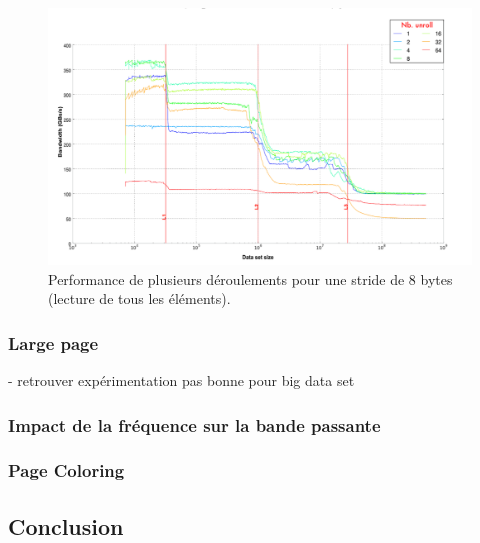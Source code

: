      
    \begin{figure}
    \center
    \includegraphics[width=16cm]{images/dml_unroll_best.png}
    \caption{\label{pic:dml_unroll_best} Performance de plusieurs déroulements pour une stride de 8 bytes (lecture de tous les éléments).}
    \end{figure}
    
    
    \subsubsection{Large page}
    - retrouver expérimentation pas bonne pour big data set
    
    
    \subsubsection{Impact de la fréquence sur la bande passante}
    
    
    \subsubsection{Page Coloring}
    
    

\subsection{Conclusion}
